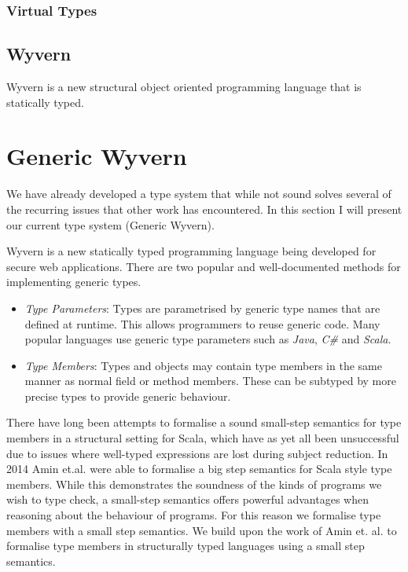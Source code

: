\documentclass[11pt
              , a4paper
              , twoside
              , openright
              ]{report}
\numberwithin{case}{theorem}
\numberwithin{subcase}{case}
\begin{document}
\subsection{Virtual Types}


\section{Wyvern}
Wyvern is a new structural object oriented programming language that is statically typed. 



\chapter{Generic Wyvern}\label{ch:wyvern}

We have already developed a type system that while not sound solves several of the recurring issues that other work has encountered. In this section I will present our current type system (Generic Wyvern).

Wyvern is a new statically typed programming language being developed for secure web applications. There are two popular and well-documented methods \cite{Virtual Types stuff, generic java etc} for implementing generic types.
\begin{itemize}
\item \emph{Type Parameters}: Types are parametrised by generic type names that are defined at runtime. This allows programmers to reuse generic code. Many popular languages use generic type parameters such as \emph{Java}, \emph{C\#} and \emph{Scala}.
\item \emph{Type Members}: Types and objects may contain type members in the same manner as normal field or method members. These can be subtyped by more precise types to provide generic behaviour.
\end{itemize}
There have long been attempts to formalise a sound small-step semantics for type members in a structural setting for Scala, which have as yet all been unsuccessful due to issues where well-typed expressions are lost during subject reduction. In 2014 Amin et.al. were able to formalise a big step semantics for Scala style type members. While this demonstrates the soundness of the kinds of programs we wish to type check, a small-step semantics offers powerful advantages when reasoning about the behaviour of programs. For this reason we formalise type members with a small step semantics.
We build upon the work of Amin et. al. \cite{Scala stuff} to formalise type members in structurally typed languages using a small step semantics. 
\end{document}
